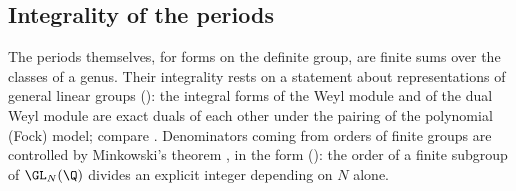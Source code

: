 \subsection{Integrality of the periods}
The periods themselves, for forms on the definite group, are finite sums over the classes of a
genus. Their integrality rests on a statement about representations of general linear groups \lvS{}
(): the integral forms of the Weyl module and of the
dual Weyl module are exact duals of each other under the pairing of the polynomial (Fock)
model; compare \cite{carterlusztig1974}. Denominators coming from orders of finite groups are
controlled by Minkowski's theorem \cite{minkowski1887}, in the form \lvS{}
(): the order of a finite subgroup of $\GL_N(\Q)$ divides an
explicit integer depending on $N$ alone.
